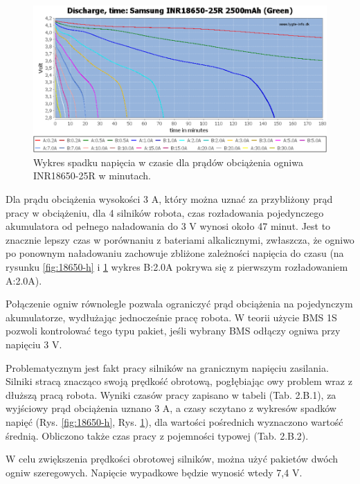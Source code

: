 \documentclass{report}
\begin{document}
\begin{enumerate}[label=(\Alph*)]
    \begin{figure}[H]
        \centering
        \includegraphics{src/cells_charts/Li-ion discharge minutes.png}
        \caption{Wykres spadku napięcia w czasie dla prądów obciążenia ogniwa INR18650-25R w minutach.}
        \label{fig:18650-m}
    \end{figure}

    Dla prądu obciążenia wysokości 3 A, który można uznać za przybliżony prąd pracy w obciążeniu, dla 4 silników robota, czas rozładowania pojedynczego akumulatora od pełnego naładowania do 3 V wynosi około 47 minut. Jest to znacznie lepszy czas w porównaniu z bateriami alkalicznymi, zwłaszcza, że ogniwo po ponownym naładowaniu zachowuje zbliżone zależności napięcia do czasu (na rysunku \ref{fig:18650-h} i \ref{fig:18650-m} wykres B:2.0A pokrywa się z pierwszym rozładowaniem A:2.0A).
    
    Połączenie ogniw równolegle pozwala ograniczyć prąd obciążenia na pojedynczym akumulatorze, wydłużając jednocześnie pracę robota. W teorii użycie BMS 1S pozwoli kontrolować tego typu pakiet, jeśli wybrany BMS odłączy ogniwa przy napięciu 3 V. 
    
    Problematycznym jest fakt pracy silników na granicznym napięciu zasilania. Silniki stracą znacząco swoją prędkość obrotową, pogłębiając owy problem wraz z dłuższą pracą robota. Wyniki czasów pracy zapisano w tabeli (Tab. 2.B.1), za wyjściowy prąd obciążenia uznano 3 A, a czasy sczytano z wykresów spadków napięć (Rys. \ref{fig:18650-h}, Rys. \ref{fig:18650-m}), dla wartości pośrednich wyznaczono wartość średnią. Obliczono także czas pracy z pojemności typowej (Tab. 2.B.2).
     

    W celu zwiększenia prędkości obrotowej silników, można użyć pakietów dwóch ogniw szeregowych. Napięcie wypadkowe będzie wynosić wtedy 7,4 V.
    

\end{enumerate}
\end{document}
